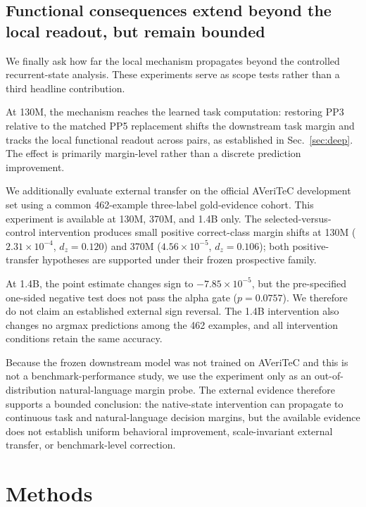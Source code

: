 \documentclass{article}
\begin{document}
\subsection{Functional consequences extend beyond the local readout, but remain bounded}
\label{sec:scope}

We finally ask how far the local mechanism propagates beyond the controlled recurrent-state analysis. These experiments serve as scope tests rather than a third headline contribution.

At 130M, the mechanism reaches the learned task computation: restoring PP3 relative to the matched PP5 replacement shifts the downstream task margin and tracks the local functional readout across pairs, as established in Sec.~\ref{sec:deep}. The effect is primarily margin-level rather than a discrete prediction improvement.

We additionally evaluate external transfer on the official AVeriTeC development set \citep{schlichtkrull2023averitec} using a common 462-example three-label gold-evidence cohort. This experiment is available at 130M, 370M, and 1.4B only. The selected-versus-control intervention produces small positive correct-class margin shifts at 130M ($2.31\times10^{-4}$, $d_z=0.120$) and 370M ($4.56\times10^{-5}$, $d_z=0.106$); both positive-transfer hypotheses are supported under their frozen prospective family.

At 1.4B, the point estimate changes sign to $-7.85\times10^{-5}$, but the pre-specified one-sided negative test does not pass the alpha gate ($p=0.0757$). We therefore do not claim an established external sign reversal. The 1.4B intervention also changes no argmax predictions among the 462 examples, and all intervention conditions retain the same accuracy.

Because the frozen downstream model was not trained on AVeriTeC and this is not a benchmark-performance study, we use the experiment only as an out-of-distribution natural-language margin probe. The external evidence therefore supports a bounded conclusion: the native-state intervention can propagate to continuous task and natural-language decision margins, but the available evidence does not establish uniform behavioral improvement, scale-invariant external transfer, or benchmark-level correction.

\section{Methods}
\label{sec:methods}
\end{document}
